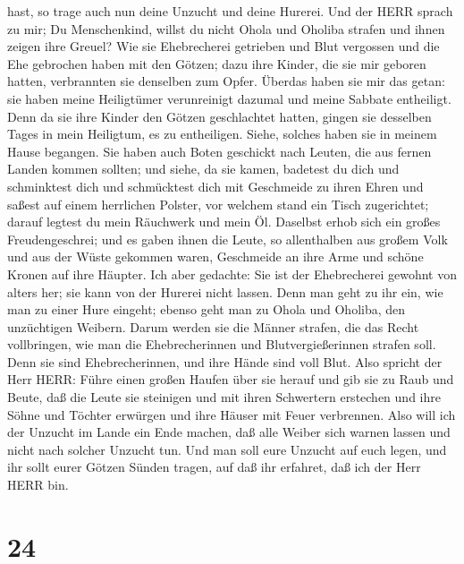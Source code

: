 hast, so trage auch nun deine Unzucht und deine Hurerei. 
Und der HERR sprach zu mir; Du Menschenkind, willst du nicht Ohola und
Oholiba strafen und ihnen zeigen ihre Greuel?  Wie sie
Ehebrecherei getrieben und Blut vergossen und die Ehe gebrochen haben
mit den Götzen; dazu ihre Kinder, die sie mir geboren hatten,
verbrannten sie denselben zum Opfer.  Überdas haben sie mir
das getan: sie haben meine Heiligtümer verunreinigt dazumal und meine
Sabbate entheiligt.  Denn da sie ihre Kinder den Götzen
geschlachtet hatten, gingen sie desselben Tages in mein Heiligtum, es zu
entheiligen. Siehe, solches haben sie in meinem Hause begangen.
 Sie haben auch Boten geschickt nach Leuten, die aus fernen
Landen kommen sollten; und siehe, da sie kamen, badetest du dich und
schminktest dich und schmücktest dich mit Geschmeide zu ihren Ehren
 und saßest auf einem herrlichen Polster, vor welchem stand
ein Tisch zugerichtet; darauf legtest du mein Räuchwerk und mein Öl.
 Daselbst erhob sich ein großes Freudengeschrei; und es
gaben ihnen die Leute, so allenthalben aus großem Volk und aus der Wüste
gekommen waren, Geschmeide an ihre Arme und schöne Kronen auf ihre
Häupter.  Ich aber gedachte: Sie ist der Ehebrecherei
gewohnt von alters her; sie kann von der Hurerei nicht lassen.
 Denn man geht zu ihr ein, wie man zu einer Hure eingeht;
ebenso geht man zu Ohola und Oholiba, den unzüchtigen Weibern.
 Darum werden sie die Männer strafen, die das Recht
vollbringen, wie man die Ehebrecherinnen und Blutvergießerinnen strafen
soll. Denn sie sind Ehebrecherinnen, und ihre Hände sind voll Blut.
 Also spricht der Herr HERR: Führe einen großen Haufen über
sie herauf und gib sie zu Raub und Beute,  daß die Leute
sie steinigen und mit ihren Schwertern erstechen und ihre Söhne und
Töchter erwürgen und ihre Häuser mit Feuer verbrennen. 
Also will ich der Unzucht im Lande ein Ende machen, daß alle Weiber sich
warnen lassen und nicht nach solcher Unzucht tun.  Und man
soll eure Unzucht auf euch legen, und ihr sollt eurer Götzen Sünden
tragen, auf daß ihr erfahret, daß ich der Herr HERR bin.

\hypertarget{section-23}{%
\section{24}\label{section-23}}

